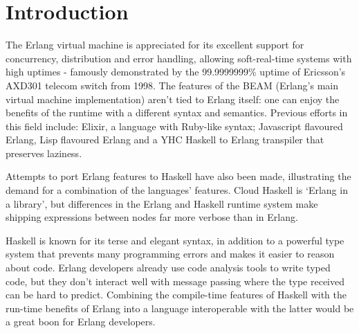 \chapter{Introduction}
The Erlang virtual machine is appreciated for its excellent support for
concurrency, distribution and error handling, allowing soft-real-time systems
with high uptimes - famously demonstrated by the 99.9999999\% uptime of
Ericsson’s AXD301 telecom switch from 1998. The features of the BEAM (Erlang’s
main virtual machine implementation) aren't tied to Erlang itself: one can
enjoy the benefits of the runtime with a different syntax and semantics.
Previous efforts in this field include: Elixir, a language with Ruby-like
syntax; Javascript flavoured Erlang, Lisp flavoured Erlang and a YHC Haskell
to Erlang transpiler that preserves laziness.

Attempts to port Erlang features to Haskell have also been made, illustrating
the demand for a combination of the languages’ features. Cloud Haskell is
‘Erlang in a library’, but differences in the Erlang and Haskell runtime
system make shipping expressions between nodes far more verbose than in Erlang.

Haskell is known for its terse and elegant syntax, in addition to a powerful
type system that prevents many programming errors and makes it easier to
reason about code. Erlang developers already use code analysis tools to write
typed code, but they don’t interact well with message passing where the type
received can be hard to predict. Combining the compile-time features of Haskell
with the run-time benefits of Erlang into a language interoperable with the
latter would be a great boon for Erlang developers.


